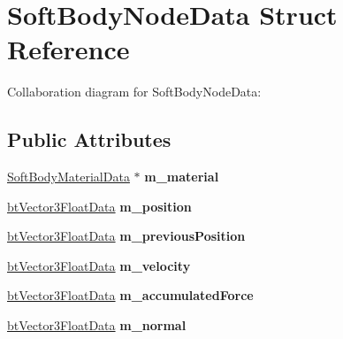 \hypertarget{struct_soft_body_node_data}{\section{Soft\+Body\+Node\+Data Struct Reference}
\label{struct_soft_body_node_data}
}


Collaboration diagram for Soft\+Body\+Node\+Data\+:
\subsection*{Public Attributes}
\begin{DoxyCompactItemize}
\item 
\hypertarget{struct_soft_body_node_data_af6baa1513e97f93a451536fdc795a4d9}{\hyperlink{struct_soft_body_material_data}{Soft\+Body\+Material\+Data} $\ast$ {\bfseries m\+\_\+material}}\label{struct_soft_body_node_data_af6baa1513e97f93a451536fdc795a4d9}

\item 
\hypertarget{struct_soft_body_node_data_aa0c132cc1752e4b630865aba51df704c}{\hyperlink{structbt_vector3_float_data}{bt\+Vector3\+Float\+Data} {\bfseries m\+\_\+position}}\label{struct_soft_body_node_data_aa0c132cc1752e4b630865aba51df704c}

\item 
\hypertarget{struct_soft_body_node_data_a4cbf9490d0df4e6d7735dff8728b785b}{\hyperlink{structbt_vector3_float_data}{bt\+Vector3\+Float\+Data} {\bfseries m\+\_\+previous\+Position}}\label{struct_soft_body_node_data_a4cbf9490d0df4e6d7735dff8728b785b}

\item 
\hypertarget{struct_soft_body_node_data_a8fb72104d280eaa306813f53df341c72}{\hyperlink{structbt_vector3_float_data}{bt\+Vector3\+Float\+Data} {\bfseries m\+\_\+velocity}}\label{struct_soft_body_node_data_a8fb72104d280eaa306813f53df341c72}

\item 
\hypertarget{struct_soft_body_node_data_a02f1a2aabf0390dfc804273ea11b8b5c}{\hyperlink{structbt_vector3_float_data}{bt\+Vector3\+Float\+Data} {\bfseries m\+\_\+accumulated\+Force}}\label{struct_soft_body_node_data_a02f1a2aabf0390dfc804273ea11b8b5c}

\item 
\hypertarget{struct_soft_body_node_data_a203d1d911752253ca23603a4b973caab}{\hyperlink{structbt_vector3_float_data}{bt\+Vector3\+Float\+Data} {\bfseries m\+\_\+normal}}\label{struct_soft_body_node_data_a203d1d911752253ca23603a4b973caab}


\end{DoxyCompactItemize}
